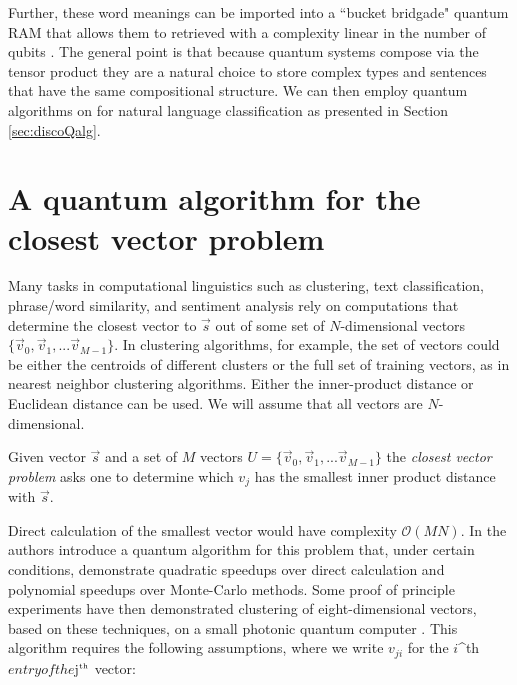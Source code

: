 Further, these word meanings can be imported into a ``bucket bridgade" quantum RAM that allows them to retrieved with a complexity linear in the number of qubits \cite{giovannetti2008quantum}. The general point is that because quantum systems compose via the tensor product they are a natural choice to store complex types and sentences that have the same compositional structure. We can then employ quantum algorithms on for natural language classification as presented in Section \ref{sec:discoQalg}.

\section{A quantum algorithm for the closest vector problem}
\label{sec:qalg}

Many tasks in computational linguistics such as clustering, text classification, phrase/word similarity, and sentiment analysis rely on computations that determine the closest vector to $\vec{s}$ out of some set of $N$-dimensional vectors $\{\vec{v}_0,\vec{v}_1,...\vec{v}_{M-1}\}$. In clustering algorithms, for example, the set of vectors could be either the centroids of different clusters or the full set of training vectors, as in nearest neighbor clustering algorithms. Either the inner-product distance or Euclidean distance can be used. We will assume that all vectors are $N$-dimensional.
\begin{definition}
Given vector $\vec{s}$ and a set of $M$ vectors $U = \{\vec{v}_0,\vec{v}_1,...\vec{v}_{M-1}\}$ the \emph{closest vector problem} asks one to determine which $v_j$ has the smallest inner product distance with $\vec{s}$.
\end{definition}
Direct calculation of the smallest vector would have complexity $\mathcal{O}(MN)$.  In \cite{wiebe2014quantum} the authors introduce a quantum algorithm for this problem that, under certain conditions, demonstrate quadratic speedups over direct calculation and polynomial speedups over Monte-Carlo methods. Some proof of principle experiments have then demonstrated clustering of eight-dimensional vectors, based on these techniques, on a small photonic quantum computer \cite{cai2015entanglement}. This algorithm requires the following assumptions, where we write $v_{ji}$ for the $i$^{\tiny\mbox{th}}$ entry of the $j$^{\tiny\mbox{th}}$ vector:
